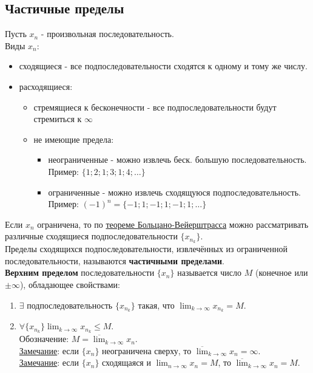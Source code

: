 \documentclass[12pt]{article}
\begin{document}
    \subsection{Частичные пределы}
    \noindent Пусть $x_n$ - произвольная последовательность.\\
    Виды $x_n$:
    \begin{itemize}
        \item сходящиеся - все подпоследовательности сходятся к одному и тому же числу.
        \item расходящиеся:
              \begin{itemize}
                \item стремящиеся к бесконечности - все подпоследовательности будут стремиться к $\infty$
                \item не имеющие предела:
                      \begin{itemize}
                        \item неограниченные - можно извлечь беск. большую последовательность.\\Пример: $\{1; 2; 1; 3; 1; 4; \dots\}$
                        \item ограниченные - можно извлечь сходящуюся подпоследовательность.\\Пример: $(-1)^n = \{-1; 1; -1; 1; -1; 1; \dots\}$
                      \end{itemize}
              \end{itemize}
    \end{itemize}
    Если $x_n$ ограничена, то по \hyperref[th:2.8.1]{теореме Больцано-Вейерштрасса} можно рассматривать различные сходящиеся подпоследовательности $\{x_{n_{k}}\}$.\\
    Пределы сходящихся подпоследовательности, извлечённых из ограниченной последовательности, называются \textbf{частичными пределами}.\\
    \textbf{Верхним пределом} последовательности $\{x_n\}$ называется число $M$ (конечное или $\pm \infty$), обладающее свойствами:
    \begin{enumerate}
        \item $\exists$ подпоследовательность $\{x_{n_{k}}\}$ такая, что $\lim_{k\to\infty}x_{n_{k}} = M$.
        \item $\forall \{x_{n_{k}}\} \lim_{k\to\infty} x_{n_{k}} \le M$.\\
        Обозначение: $M = \overline{\lim}_{k\to\infty}x_n$.\\
        \underline{Замечание}: если $\{x_n\}$ неограничена сверху, то $\overline{\lim}_{k\to\infty}x_n = \infty$.\\
        \underline{Замечание}: если $\{x_n\}$ сходящаяся и $\lim_{n\to\infty} x_n = M$, то $\overline{\lim}_{k\to\infty}x_n = M$.
    \end{enumerate}
\end{document}
